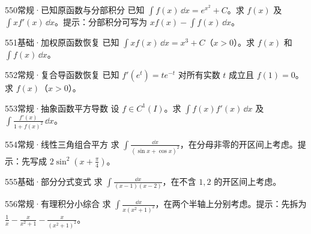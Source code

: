 \begin{exercise}{550}{常规·已知原函数与分部积分}
已知 $\int f(x)\,\dd x=e^{x^2}+C$。求 $f(x)$ 及 $\int xf'(x)\,\dd x$。提示：分部积分可写为 $xf(x)-\int f(x)\,\dd x$。
\end{exercise}
\begin{exercise}{551}{基础·加权原函数恢复}
已知 $\int xf(x)\,\dd x=x^3+C$（$x>0$）。求 $f(x)$ 和 $\int f(x)\,\dd x$。
\end{exercise}
\begin{exercise}{552}{常规·复合导函数恢复}
已知 $f'(e^t)=te^{-t}$ 对所有实数 $t$ 成立且 $f(1)=0$。求 $f(x)$（$x>0$）。
\end{exercise}
\begin{exercise}{553}{常规·抽象函数平方导数}
设 $f\in C^1(I)$。求 $\int f(x)f'(x)\,\dd x$ 及 $\int\frac{f'(x)}{1+f(x)^2}\,\dd x$。
\end{exercise}
\begin{exercise}{554}{常规·线性三角组合平方}
求 $\int\frac{\dd x}{(\sin x+\cos x)^2}$，在分母非零的开区间上考虑。提示：先写成 $2\sin^2(x+\frac{\pi}{4})$。
\end{exercise}
\begin{exercise}{555}{基础·部分分式变式}
求 $\int\frac{\dd x}{(x-1)(x-2)}$，在不含 $1,2$ 的开区间上考虑。
\end{exercise}
\begin{exercise}{556}{常规·有理积分小综合}
求 $\int\frac{\dd x}{x(x^2+1)^2}$，在两个半轴上分别考虑。提示：先拆为 $\frac{1}{x}-\frac{x}{x^2+1}-\frac{x}{(x^2+1)^2}$。
\end{exercise}
